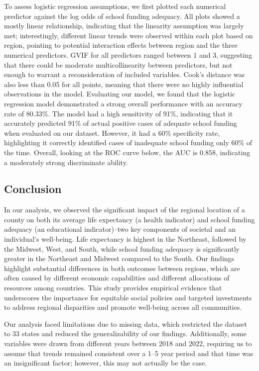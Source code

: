 \documentclass[
  10pt,
  letterpaper,
  DIV=11,
  numbers=noendperiod]{scrartcl}
\begin{document}
To assess logistic regression assumptions, we first plotted each
numerical predictor against the log odds of school funding adequacy. All
plots showed a mostly linear relationship, indicating that the linearity
assumption was largely met; interestingly, different linear trends were
observed within each plot based on region, pointing to potential
interaction effects between region and the three numerical predictors.
GVIF for all predictors ranged between 1 and 3, suggesting that there
could be moderate multicollinearity between predictors, but not enough
to warrant a reconsideration of included variables. Cook's distance was
also less than 0.05 for all points, meaning that there were no highly
influential observations in the model. Evaluating our model, we found
that the logistic regression model demonstrated a strong overall
performance with an accuracy rate of 80.33\%. The model had a high
sensitivity of 91\%, indicating that it accurately predicted 91\% of
actual positive cases of adequate school funding when evaluated on our
dataset. However, it had a 60\% specificity rate, highlighting it
correctly identified cases of inadequate school funding only 60\% of the
time. Overall, looking at the ROC curve below, the AUC is 0.858,
indicating a moderately strong discriminate ability.~

\subsection{\texorpdfstring{\textbf{Conclusion}}{Conclusion}}\label{conclusion}

In our analysis, we observed the significant impact of the regional
location of a county on both its average life expectancy (a health
indicator) and school funding adequacy (an educational indicator)--two
key components of societal and an individual's well-being. Life
expectancy is highest in the Northeast, followed by the Midwest, West,
and South, while school funding adequacy is significantly greater in the
Northeast and Midwest compared to the South. Our findings highlight
substantial differences in both outcomes between regions, which are
often caused by different economic capabilities and different
allocations of resources among countries. This study provides empirical
evidence that underscores the importance for equitable social policies
and targeted investments to address regional disparities and promote
well-being across all communities.

Our analysis faced limitations due to missing data, which restricted the
dataset to 33 states and reduced the generalizability of our findings.
Additionally, some variables were drawn from different years between
2018 and 2022, requiring us to assume that trends remained consistent
over a 1--5 year period and that time was an insignificant factor;
however, this may not actually be the case.
\end{document}
